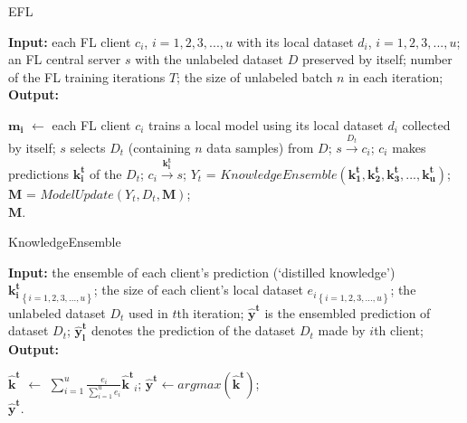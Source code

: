 \documentclass[journal]{IEEEtran}
\begin{document}
\begin{algorithm}[t]
\caption{EFL} %
\label{alg:system}
\hspace*{0.02in} {\bf Input:} %
each FL client $c_i$, $i=1,2,3,...,u$ with its local dataset $d_i$, $i=1,2,3,...,u$; an FL central server $s$ with the unlabeled dataset $D$ preserved by itself; number of the FL training iterations $T$; the size of unlabeled batch $n$ in each iteration;\\
\hspace*{0.02in} {\bf Output:} %
\begin{algorithmic}[1]
  \State $\mathbf{m_i}$ $\gets$ each FL client $c_i$ trains a local model using its local dataset $d_i$ collected by itself;
    \State $s$ selects $D_t$ (containing $n$ data samples) from $D$;
      \State $s \overset{D_{t}}{\rightarrow} c_{i}$;
      \State $c_i$ makes predictions $\mathbf{k_i^t}$ of the $D_t$;
      \State $c_i \overset{\mathbf{k_i^t}}{\rightarrow} s$;
    \EndFor
    \State $Y_t$ = $KnowledgeEnsemble(\mathbf{k_1^t},\mathbf{k_2^t},\mathbf{k_3^t},...,\mathbf{k_u^t})$;
    \State $\mathbf{M}$ = $ModelUpdate(Y_t, D_t, \mathbf{M})$;
  \EndFor \\
  \Return $\mathbf{M}$.
\end{algorithmic}
\end{algorithm}

\begin{algorithm}[t]
\caption{KnowledgeEnsemble} %
\label{alg:KnowledgeEnsemble}
\hspace*{0.02in} {\bf Input:} %
the ensemble of each client's prediction (`distilled knowledge') ${\mathbf{k_i^t}}_{\left \{ i= 1,2,3,...,u \right \}}$; the size of each client's local dataset ${e_i}_{\left \{ i= 1,2,3,...,u \right \}}$; the unlabeled dataset $D_t$ used in $t$th iteration; $\mathbf{\hat{y}^t}$ is the ensembled prediction of dataset $D_t$; $\mathbf{\hat{y}^t_l}$ denotes the prediction of the dataset $D_t$ made by $i$th client;\\
\hspace*{0.02in} {\bf Output:} %
\begin{algorithmic}[1]
    \State $\mathbf{\hat{k}^t}$ $\gets$ $\sum_{i=1}^{u}\frac{e_i}{\sum_{i=1}^{u}e_i}\mathbf{\hat{k}^t}_i$;
    \State $\mathbf{\hat{y}^t}\gets argmax(\mathbf{\hat{k}^t})$;
  \EndFor \\
  \Return $\mathbf{\hat{y}^t}$.
\end{algorithmic}

\end{algorithm}
\end{document}
